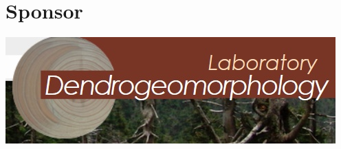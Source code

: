 \documentclass[
	openany, %
	parskip=false, %
	12pt, %
	a4paper, %
]{conferencebooklet} %
\begin{document}









\chapter{Sponsor}
\centering
\includegraphics[width=0.9\linewidth]{"images/logos/Partnerlogos/logo dendro"}


\vfill


\newpage

\thispagestyle{empty} %
\pagecolor{myblue} %
~

\end{document}
